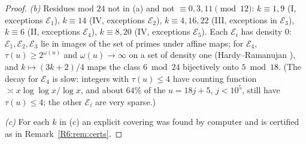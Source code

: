 \documentclass[11pt]{amsart}
\theoremstyle{definition}
\theoremstyle{remark}
\begin{document}
\begin{proof}
\emph{(b)} Residues mod $24$ not in (a) and not $\equiv0,3,11\pmod{12}$: $k\equiv1,9$ (I, exceptions
$\mathcal E_1$), $k\equiv14$ (IV, exceptions $\mathcal E_2$), $k\equiv4,16,22$ (III, exceptions in
$\mathcal E_3$), $k\equiv6$ (II, exceptions $\mathcal E_4$), $k\equiv8,20$ (IV, exceptions
$\mathcal E_5$). Each $\mathcal E_i$ has density $0$: $\mathcal E_1,\mathcal E_2,\mathcal E_3$ lie in
images of the set of primes under affine maps; for $\mathcal E_4$, $\tau(u)\ge2^{\omega(u)}$ and
$\omega(u)\to\infty$ on a set of density one (Hardy--Ramanujan \cite{R6-HR}), and $k\mapsto(3k+2)/4$ maps the class
$6\bmod24$ bijectively onto $5\bmod18$. (The decay for $\mathcal E_4$ is slow: integers with
$\tau(u)\le4$ have counting function $\asymp x\log\log x/\log x$, and about $64\%$ of the $u=18j+5$,
$j<10^5$, still have $\tau(u)\le4$; the other $\mathcal E_i$ are very sparse.)

\emph{(c)} For each $k$ in (c) an explicit covering was found by computer and is certified as in
Remark~\ref{R6:rem:certs}.
\end{proof}
\end{document}
